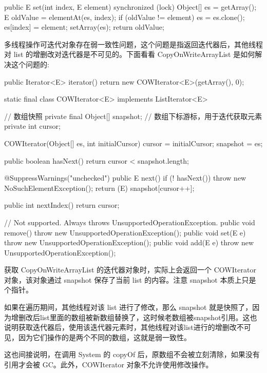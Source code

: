 \begin{Java}
public E set(int index, E element) {
    synchronized (lock) {
        Object[] es = getArray();
        E oldValue = elementAt(es, index);
        if (oldValue != element) {
            es = es.clone();
            es[index] = element;
        }
        setArray(es);
        return oldValue;
    }
}
\end{Java}

多线程操作可迭代对象存在弱一致性问题，这个问题是指返回迭代器后，其他线程对 list 的增删改对迭代器是不可见的。下面看看 CopyOnWriteArrayList 是如何解决这个问题的:

\begin{Java}
public Iterator<E> iterator() {
    return new COWIterator<E>(getArray(), 0);
}

static final class COWIterator<E> implements ListIterator<E> {
    // 数组快照
    private final Object[] snapshot;
    // 数组下标游标，用于迭代获取元素
    private int cursor;

    COWIterator(Object[] es, int initialCursor) {
        cursor = initialCursor;
        snapshot = es;
    }

    public boolean hasNext() {
        return cursor < snapshot.length;
    }

    @SuppressWarnings("unchecked")
    public E next() {
        if (! hasNext())
            throw new NoSuchElementException();
        return (E) snapshot[cursor++];
    }

    public int nextIndex() {
        return cursor;
    }

    // Not supported. Always throws UnsupportedOperationException.
    public void remove() {
        throw new UnsupportedOperationException();
    }
    public void set(E e) {
        throw new UnsupportedOperationException();
    }
    public void add(E e) {
        throw new UnsupportedOperationException();
    }
}
\end{Java}

获取 CopyOnWriteArrayList 的迭代器对象时，实际上会返回一个 COWIterator 对象，该对象通过 snapshot 保存了当前 list 的内容。注意 snapshot 本质上只是个指针。

如果在遍历期间，其他线程对该 list 进行了修改，那么 snapshot 就是快照了，因为增删改后list里面的数组被新数组替换了，这时候老数组被snapshot引用。这也说明获取迭代器后，使用该迭代器元素时，其他线程对该list进行的增删改不可见，因为它们操作的是两个不同的数组，这就是弱一致性。

这也间接说明，在调用 System 的 copyOf 后，原数组不会被立刻清除，如果没有引用才会被 GC。此外，COWIterator 对象不允许使用修改操作。

